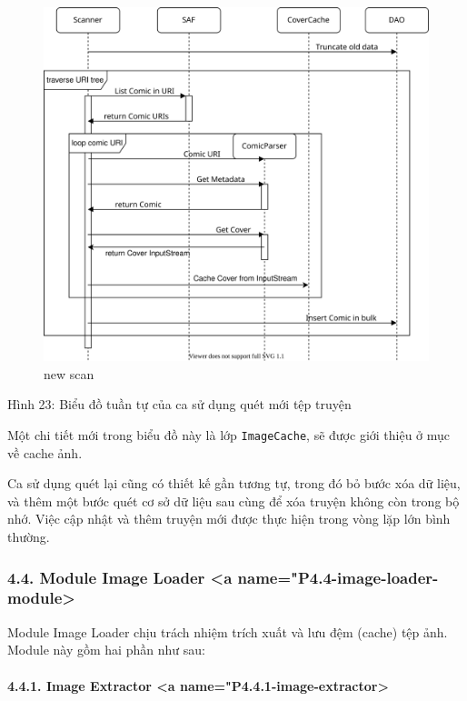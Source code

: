 \documentclass[
]{article}
\begin{document}
\begin{figure}
\centering
\includegraphics{../images/scan_new_sequence.svg}
\caption{new scan}
\end{figure}

Hình 23: Biểu đồ tuần tự của ca sử dụng quét mới tệp truyện

Một chi tiết mới trong biểu đồ này là lớp \texttt{ImageCache}, sẽ được
giới thiệu ở mục về cache ảnh.

Ca sử dụng quét lại cũng có thiết kế gần tương tự, trong đó bỏ bước xóa
dữ liệu, và thêm một bước quét cơ sở dữ liệu sau cùng để xóa truyện
không còn trong bộ nhớ. Việc cập nhật và thêm truyện mới được thực hiện
trong vòng lặp lớn bình thường.

\hypertarget{module-image-loader-a-namep4.4-image-loader-module}{%
\subsubsection{4.4. Module Image Loader \textless a
name="P4.4-image-loader-module>}\label{module-image-loader-a-namep4.4-image-loader-module}}

Module Image Loader chịu trách nhiệm trích xuất và lưu đệm (cache) tệp
ảnh. Module này gồm hai phần như sau:

\hypertarget{image-extractor-a-namep4.4.1-image-extractor}{%
\paragraph{4.4.1. Image Extractor \textless a
name="P4.4.1-image-extractor>}\label{image-extractor-a-namep4.4.1-image-extractor}}
\end{document}
